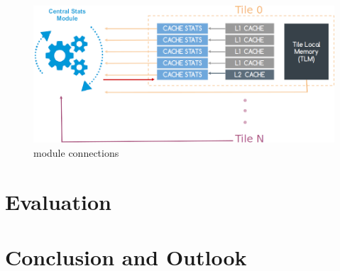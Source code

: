 \documentclass{listhesis}
\begin{document}
\begin{figure}
  \includegraphics[width=\linewidth]{moduleconnections.png}
  \centering
  \caption{module connections}
  \label{fig:moduleconnections}
\end{figure}
\chapter{Evaluation}

\chapter{Conclusion and Outlook}


\cleardoublepage



\confirmation
\end{document}
